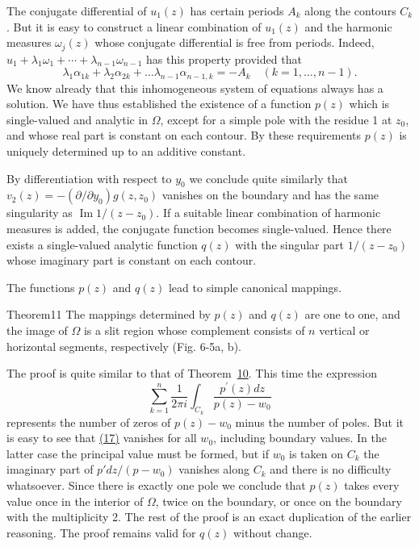 The conjugate differential of $u_{1}(z)$ has certain periods $A_{k}$ along the contours $C_{k}$. But it is easy to construct a linear combination of $u_{1}(z)$ and the harmonic measures $\omega_{j}(z)$ whose conjugate differential is free from periods. Indeed, $u_{1} + \lambda_{1}\omega_{1} + \cdots + \lambda_{n-1}\omega_{n-1}$ has this property provided that
\begin{equation*}
\lambda_ {1} \alpha_ {1 k} + \lambda_ {2} \alpha_ {2 k} + \dots \lambda_ {n - 1} \alpha_ {n - 1, k} = - A _ {k} \quad (k = 1, \dots , n - 1).
\end{equation*}
We know already that this inhomogeneous system of equations always has a solution. We have thus established the existence of a function
$p(z)$ which is single-valued and analytic in $\Omega$, except for a simple pole with the residue 1 at $z_{0}$, and whose real part is constant on each contour. By these requirements $p(z)$ is uniquely determined up to an additive constant.

By differentiation with respect to $y_{0}$ we conclude quite similarly that $v_{2}(z) = -(\partial/\partial y_{0})g(z,z_{0})$ vanishes on the boundary and has the same singularity as $\operatorname{Im} 1/(z - z_{0})$. If a suitable linear combination of harmonic measures is added, the conjugate function becomes single-valued. Hence there exists a single-valued analytic function $q(z)$ with the singular part $1/(z - z_{0})$ whose imaginary part is constant on each contour.

The functions $p(z)$ and $q(z)$ lead to simple canonical mappings.

\begin{originalstatement}{Theorem}{11}\label{thm:6.11}
The mappings determined by $p(z)$ and $q(z)$ are one to one, and the image of $\Omega$ is a slit region whose complement consists of $n$ vertical or horizontal segments, respectively (Fig. 6-5a, b).
\end{originalstatement}
The proof is quite similar to that of Theorem~\hyperref[thm:6.10]{10}. This time the expression
\begin{equation*}
\sum_ {k = 1} ^ {n} \frac {1}{2 \pi i} \int_ {C _ {k}} \frac {p ^ {\prime} (z) d z}{p (z) - w _ {0}}\tag{17}\label{eq:6.17}
\end{equation*}
represents the number of zeros of $p(z) - w_{0}$ minus the number of poles. But it is easy to see that \hyperref[eq:6.17]{(17)} vanishes for all $w_{0}$, including boundary values. In the latter case the principal value must be formed, but if $w_{0}$ is taken on $C_{k}$ the imaginary part of $p' dz/(p - w_{0})$ vanishes along $C_{k}$ and there is no difficulty whatsoever. Since there is exactly one pole we conclude that $p(z)$ takes every value once in the interior of $\Omega$, twice on the boundary, or once on the boundary with the multiplicity 2. The rest of the proof is an exact duplication of the earlier reasoning. The proof remains valid for $q(z)$ without change.

